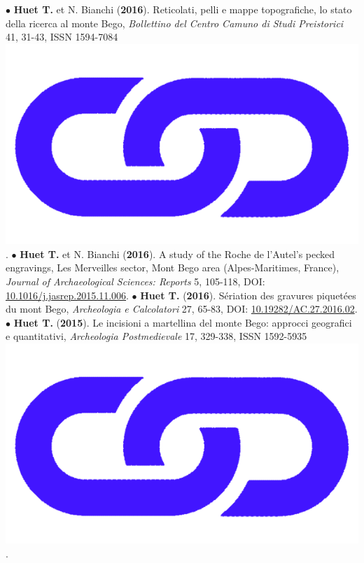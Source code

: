 \documentclass{article}
\begin{document}
$\bullet$ \textbf{Huet T.} et N. Bianchi (\textbf{2016}). Reticolati, pelli e mappe topografiche, lo stato della ricerca al monte Bego, \textit{Bollettino del Centro Camuno di Studi Preistorici} 41, 31-43, ISSN 1594-7084 \href{http://www.ccsp.it/web/infoccsp/bcsp/bcsp41_preview.pdf}{\includegraphics[scale=0.02]{link_darkblue.png}}.
\smallbreak
$\bullet$ \textbf{Huet T.} et N. Bianchi (\textbf{2016}). A study of the Roche de l'Autel's pecked engravings, Les Merveilles sector, Mont Bego area (Alpes-Maritimes, France), \textit{Journal of Archaeological Sciences: Reports} 5, 105-118, DOI: \href{https://doi.org/10.1016/j.jasrep.2015.11.006}{10.1016/j.jasrep.2015.11.006}.
\smallbreak
$\bullet$ \textbf{Huet T.} (\textbf{2016}). S\'{e}riation des gravures piquet\'{e}es du mont Bego, \textit{Archeologia e Calcolatori} 27, 65-83, DOI: \href{https://doi.org/10.19282/AC.27.2016.02}{10.19282/AC.27.2016.02}.
\smallbreak
$\bullet$ \textbf{Huet T.} (\textbf{2015}). Le incisioni a martellina del monte Bego: approcci geografici e quantitativi, \textit{Archeologia Postmedievale} 17, 329-338, ISSN 1592-5935 \href{https://www.insegnadelgiglio.it/wp-content/uploads/2015/01/APM_17_libro-anteprima.pdf}{\includegraphics[scale=0.02]{link_darkblue.png}}.
\end{document}
